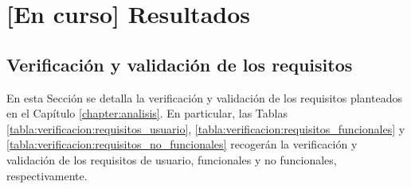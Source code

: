 \chapter{[En curso] Resultados}
\label{chapter:resultados}


\section{Verificación y validación de los requisitos}

    En esta Sección se detalla la verificación y validación de los requisitos planteados en el Capítulo \ref{chapter:analisis}. En particular, las Tablas \ref{tabla:verificacion:requisitos_usuario}, \ref{tabla:verificacion:requisitos_funcionales} y \ref{tabla:verificacion:requisitos_no_funcionales} recogerán la verificación y validación de los requisitos de usuario, funcionales y no funcionales, respectivamente.

